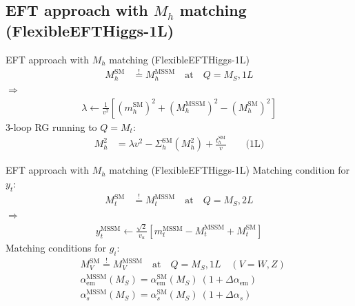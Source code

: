 \documentclass[hyperref={pdfpagelabels=false},ngerman]{beamer}
\newcommand{\SM}{\ensuremath{\text{SM}}}
\newcommand{\MSSM}{\ensuremath{\text{MSSM}}}
\begin{document}
\subsection{EFT approach with $M_h$ matching (FlexibleEFTHiggs-1L)}

\begin{frame}{EFT approach with $M_h$ matching (FlexibleEFTHiggs-1L)}
  \begin{align*}
    M_h^{\SM} &\overset{!}{=} M_h^\text{MSSM} \quad \text{at} \quad Q = M_S, 1L
  \end{align*}
  $\Rightarrow$
  \begin{align*}
    \lambda \leftarrow \frac{1}{v^2} \left[
      (m_h^\SM)^2 + (M_h^\text{MSSM})^2 - (M_h^\SM)^2
    \right]
  \end{align*}
  3-loop RG running to $Q = M_t$:
  \begin{align*}
    M_h^2 &= \lambda v^2 - \Sigma^{\SM}_h(M_h^2) + \frac{t_h^\SM}{v}
    \qquad \text{(1L)}
  \end{align*}
\end{frame}

\begin{frame}{EFT approach with $M_h$ matching (FlexibleEFTHiggs-1L)}
  Matching condition for $y_t$:
  \begin{align*}
    M_t^{\SM} &\overset{!}{=} M_t^\text{MSSM} \quad \text{at} \quad Q = M_S, 2L
  \end{align*}
  $\Rightarrow$
  \begin{align*}
    y_t^\MSSM \leftarrow \frac{\sqrt{2}}{v_u} \left[
      m_t^\MSSM - M_t^\MSSM + M_t^\SM
    \right]
  \end{align*}
  Matching conditions for $g_i$:
  \begin{align*}
    &M_V^{\SM} \overset{!}{=} M_V^\text{MSSM} \quad \text{at} \quad Q = M_S, 1L \quad (V = W,Z)\\
    &\alpha_{\text{em}}^\MSSM(M_S) = \alpha_{\text{em}}^\SM(M_S) \ (1 + \Delta\alpha_{\text{em}})\\
    &\alpha_s^\MSSM(M_S) = \alpha_s^\SM(M_S) \ (1 + \Delta\alpha_s)
  \end{align*}
\end{frame}

\end{document}
